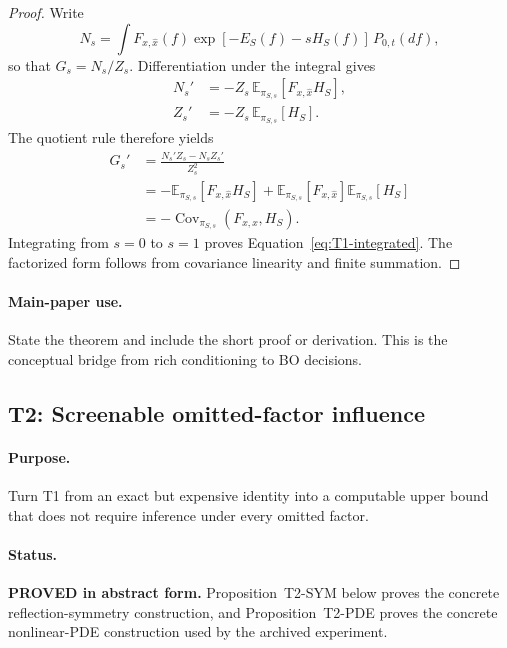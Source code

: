\begin{proof}
Write
\[
    N_s
    = \int F_{x,\widehat x}(f)
      \exp[-E_S(f)-sH_S(f)]\,P_{0,t}(df),
\]
so that $G_s=N_s/Z_s$.  Differentiation under the integral gives
\begin{align*}
    N_s'
    &= -Z_s\,\mathbb E_{\pi_{S,s}}[F_{x,\widehat x}H_S],\\
    Z_s'
    &= -Z_s\,\mathbb E_{\pi_{S,s}}[H_S].
\end{align*}
The quotient rule therefore yields
\begin{align*}
    G_s'
    &= \frac{N_s'Z_s-N_sZ_s'}{Z_s^2}\\
    &= -\mathbb E_{\pi_{S,s}}[F_{x,\widehat x}H_S]
       +\mathbb E_{\pi_{S,s}}[F_{x,\widehat x}]
        \mathbb E_{\pi_{S,s}}[H_S]\\
    &= -\operatorname{Cov}_{\pi_{S,s}}
       (F_{x,\widehat x},H_S).
\end{align*}
Integrating from $s=0$ to $s=1$ proves
Equation~\eqref{eq:T1-integrated}.  The factorized form follows from covariance
linearity and finite summation.
\end{proof}

\paragraph{Main-paper use.}
State the theorem and include the short proof or derivation.  This is the
conceptual bridge from rich conditioning to BO decisions.

\subsection{T2: Screenable omitted-factor influence}

\paragraph{Purpose.}
Turn T1 from an exact but expensive identity into a computable upper bound that
does not require inference under every omitted factor.

\paragraph{Status.}
\textbf{PROVED in abstract form.}  Proposition~T2-SYM below proves the concrete
reflection-symmetry construction, and Proposition~T2-PDE proves the concrete
nonlinear-PDE construction used by the archived experiment.

